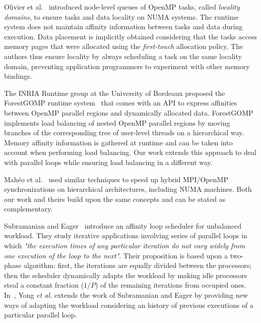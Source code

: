 \documentclass{Styles/llncs}
\begin{document}
Olivier et
al.~\cite{Olivier-pre-queue-Bronis,Olivier:2012:CMW:2388996.2389085}
introduced node-level queues of OpenMP tasks, called \textit{locality
  domains}, to ensure tasks and data locality on NUMA systems. The
runtime system does not maintain affinity information between tasks
and data during execution. Data placement is implicitly obtained
considering that the tasks access memory pages that were allocated
using the \textit{first-touch} allocation policy. The authors thus
ensure locality by always scheduling a task on the same locality
domain, preventing application programmers to experiment with other
memory bindings.

The INRIA Runtime group at the University of Bordeaux proposed the
ForestGOMP runtime system~\cite{BroAumGogThiWacNam10IPDPS} that comes
with an API to express affinities between OpenMP parallel regions and
dynamically allocated data. ForestGOMP implements load balancing of
nested OpenMP parallel regions by moving branches of the corresponding
tree of user-level threads on a hierarchical way. Memory affinity
information is gathered at runtime and can be taken into account when
performing load balancing. Our work extends this approach to deal with
parallel loops while ensuring load balancing in a different way.

Mahéo et al.~\cite{Maheo-MPC-OpenMP} used similar techniques to
speed up hybrid MPI/OpenMP synchronizations on hierarchical
architectures, including NUMA machines. Both our work and theirs build
upon the same concepts and can be stated as complementary.

Subramanian and Eager~\cite{Subramaniam:1994} introduce an affinity
loop scheduler for unbalanced workload. They study iterative
applications involving series of parallel loops in which \textit{"the
  execution times of any particular iteration do not vary widely from
  one execution of the loop to the
  next"}\cite{Subramaniam:1994}. Their proposition is based upon a
two-phase algorithm: first, the iterations are equally divided between
the processors; then the scheduler dynamically adapts the workload by
making idle processors steal a constant fraction ($1/P$) of the
remaining iterations from occupied ones. In~\cite{Yong97}, Yong
\textit{et al.}  extends the work of Subramanian and Eager by
providing new ways of adapting the workload considering an history of
previous executions of a particular parallel loop.
\end{document}
